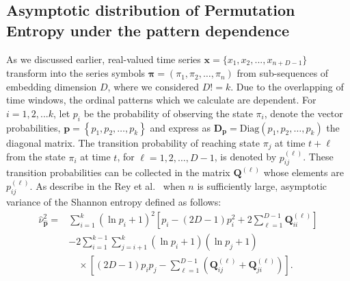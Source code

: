 \subsection{Asymptotic distribution of Permutation Entropy under the pattern dependence}\label{Subsec:PatternDependence}

As we discussed earlier, real-valued time series $\mathbf{x}=\{x_1,x_2,...,x_{n+D-1}\}$  transform into the series symbols $\mathbf{{\pi}}=({\pi}_1, {\pi}_2,\dots, {\pi}_n)$ from sub-sequences of embedding dimension $D$, where we considered $D!=k$. Due to the overlapping of time windows, the ordinal patterns which we calculate are dependent. 
For $i=1,2,...k$, let $p_i$ be the probability of observing the state $\pi_i$, denote the vector probabilities, $\mathbf{p}={\left\{p_1,p_2,\dots,p_k\right\}}$ and express as $\mathbf{D_p}=\text{Diag}(p_1,p_2, \dots, p_k)$ the diagonal matrix. 
The transition probability of reaching state $\pi_j$ at time 
$t+\ell$ from the state $\pi_i$ at time $t$, for $\ell=1,2,\dots,D-1$, is denoted by $p^{(\ell)}_{ij}$. These transition probabilities can be collected in the matrix $\mathbf{Q}^{(\ell)}$ whose elements are  $p^{(\ell)}_{ij}$. As describe in the Rey et al.~\cite{Rey2023a} when $n$ is sufficiently large, asymptotic variance of the Shannon entropy defined as follows:
\begin{equation}
	\begin{split}
		\widehat{\nu}^2_{\widehat{\mathbf{p}}} = & \sum_{i=1}^{k}(\ln p_i + 1)^2 
		\left[ p_i - (2D - 1)p_i^2 + 2\sum_{\ell=1}^{D-1} \mathbf{Q}^{(\ell)}_{ii} \right] \\
		& - 2 \sum_{i=1}^{k-1} \sum_{j=i+1}^{k} (\ln p_i + 1)(\ln p_j + 1) \\
		& \quad \times \left[ (2D - 1)p_i p_j - \sum_{\ell=1}^{D-1} \left( \mathbf{Q}^{(\ell)}_{ij} + \mathbf{Q}^{(\ell)}_{ji} \right) \right].
	\end{split}
	\label{eq:asympvar}
\end{equation} 

